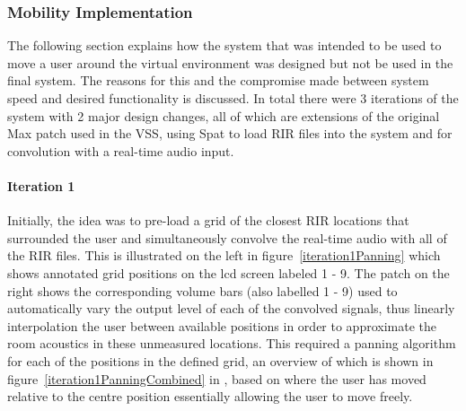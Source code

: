\documentclass[../../main.tex]{subfiles}
\begin{document}
		\subsubsection{Mobility Implementation}


		The following section explains how the system that was intended to be used to move a user around the virtual environment was designed but not be used in the final system. The reasons for this and the compromise made between system speed and desired functionality is discussed. In total there were 3 iterations of the system with 2 major design changes, all of which are extensions of the original Max patch used in the \ac{VSS}, using Spat to load \ac{RIR} files into the system and for convolution with a real-time audio input.

		 \paragraph{Iteration 1}
		 \label{iteration1}

		 	Initially, the idea was to pre-load a grid of the closest \ac{RIR} locations that surrounded the user and simultaneously convolve the real-time audio with all of the \ac{RIR} files. This is illustrated on the left in figure~\ref{iteration1Panning} which shows annotated grid positions on the lcd screen labeled 1 - 9. The patch on the right shows the corresponding volume bars (also labelled 1 - 9) used to automatically vary the output level of each of the convolved signals, thus linearly interpolation the user between available positions in order to approximate the room acoustics in these unmeasured locations. This required a panning algorithm for each of the positions in the defined grid, an overview of which is shown in figure~\ref{iteration1PanningCombined} in , based on where the user has moved relative to the centre position essentially allowing the user to move freely.
\end{document}
